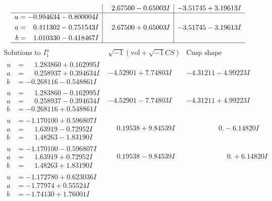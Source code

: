 \documentclass[1p]{elsarticle_modified}
\theoremstyle{definition}
\newcommand{\I}{\sqrt{-1}}
\begin{document}
$$\begin{array}{c|c|c}
 & \phantom{-}2.67500 - 0.65003 I & -3.51745 + 3.19613 I \\ \hline\begin{aligned}
u &= -0.994634 - 0.800004 I \\
a &= \phantom{-}0.411302 - 0.751543 I \\
b &= \phantom{-}1.010330 - 0.418467 I\end{aligned}
 & \phantom{-}2.67500 + 0.65003 I & -3.51745 - 3.19613 I\\
 \hline 
 \end{array}$$\newpage$$\begin{array}{c|c|c}  
\text{Solutions to }I^u_{1}& \I (\text{vol} + \sqrt{-1}CS) & \text{Cusp shape}\\
 \hline 
\begin{aligned}
u &= \phantom{-}1.283860 + 0.162995 I \\
a &= \phantom{-}0.258937 + 0.394634 I \\
b &= -0.268116 - 0.548861 I\end{aligned}
 & -4.52901 + 7.74803 I & -4.31211 - 4.99223 I \\ \hline\begin{aligned}
u &= \phantom{-}1.283860 - 0.162995 I \\
a &= \phantom{-}0.258937 - 0.394634 I \\
b &= -0.268116 + 0.548861 I\end{aligned}
 & -4.52901 - 7.74803 I & -4.31211 + 4.99223 I \\ \hline\begin{aligned}
u &= -1.170100 + 0.596807 I \\
a &= \phantom{-}1.63919 - 0.72952 I \\
b &= \phantom{-}1.48263 - 1.83190 I\end{aligned}
 & \phantom{-}0.19538 + 9.84539 I & \phantom{-0.000000 } 0. - 6.14820 I \\ \hline\begin{aligned}
u &= -1.170100 - 0.596807 I \\
a &= \phantom{-}1.63919 + 0.72952 I \\
b &= \phantom{-}1.48263 + 1.83190 I\end{aligned}
 & \phantom{-}0.19538 - 9.84539 I & \phantom{-0.000000 -}0. + 6.14820 I \\ \hline\begin{aligned}
u &= -1.172780 + 0.623036 I \\
a &= -1.77974 + 0.55524 I \\
b &= -1.74130 + 1.76001 I\end{aligned}

\end{array}$$
\end{document}
